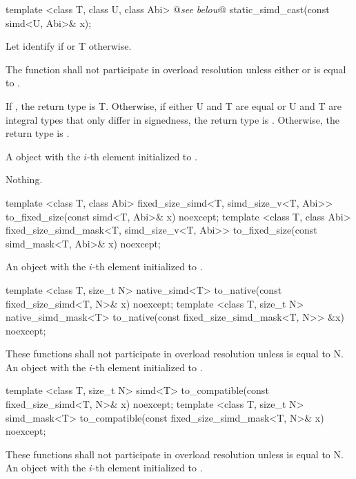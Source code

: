 \begin{itemdecl}
template <class T, class U, class Abi> @\emph{see below}@ static_simd_cast(const simd<U, Abi>& x);
\end{itemdecl}
\begin{itemdescr}
  \pnum\remarks Let  identify  if  or \type T otherwise.

  \pnum\remarks The function shall not participate in overload resolution unless either  or  is equal to .

  \pnum\remarks If , the return type is \type T.
  Otherwise, if either \type U and \type T are equal or \type U and \type T are integral types that only differ in signedness, the return type is \simd[<T, Abi>].
  Otherwise, the return type is .

  \pnum\returns A \simd object with the $i$-th element initialized to .

  \pnum\throws Nothing.
\end{itemdescr}

\begin{itemdecl}
template <class T, class Abi>
fixed_size_simd<T, simd_size_v<T, Abi>> to_fixed_size(const simd<T, Abi>& x) noexcept;
template <class T, class Abi>
fixed_size_simd_mask<T, simd_size_v<T, Abi>> to_fixed_size(const simd_mask<T, Abi>& x) noexcept;
\end{itemdecl}
\begin{itemdescr}
  \pnum\returns An object with the $i$-th element initialized to .
\end{itemdescr}

\begin{itemdecl}
template <class T, size_t N> native_simd<T> to_native(const fixed_size_simd<T, N>& x) noexcept;
template <class T, size_t N> native_simd_mask<T> to_native(const fixed_size_simd_mask<T, N>> &x) noexcept;
\end{itemdecl}
\begin{itemdescr}
  \pnum\remarks These functions shall not participate in overload resolution unless  is equal to \code N.
  \pnum\returns An object with the $i$-th element initialized to .
\end{itemdescr}

\begin{itemdecl}
template <class T, size_t N> simd<T> to_compatible(const fixed_size_simd<T, N>& x) noexcept;
template <class T, size_t N> simd_mask<T> to_compatible(const fixed_size_simd_mask<T, N>& x) noexcept;
\end{itemdecl}
\begin{itemdescr}
  \pnum\remarks These functions shall not participate in overload resolution unless  is equal to \code N.
  \pnum\returns An object with the $i$-th element initialized to .
\end{itemdescr}

